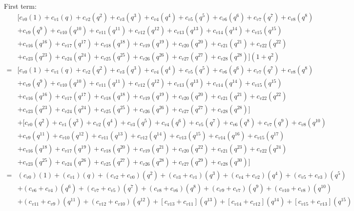 \documentclass[12pt]{article}
\begin{document}
First term:
\begin{align}
    &[  c_{v0}(1) + c_{v1}(q) + c_{v2}(q^2) + c_{v3}(q^3) + c_{v4}(q^4) + c_{v5}(q^5) + c_{v6}(q^6) + c_{v7}(q^7) + c_{v8}(q^8) \nonumber\\
    &+ c_{v9}(q^9) + c_{v10}(q^{10}) + c_{v11}(q^{11}) + c_{v12}(q^{12}) + c_{v13}(q^{13}) + c_{v14}(q^{14}) + c_{v15}(q^{15}) \nonumber\\
    &+ c_{v16}(q^{16})+ c_{v17}(q^{17}) + c_{v18}(q^{18}) + c_{v19}(q^{19}) + c_{v20}(q^{20}) + c_{v21}(q^{21}) + c_{v22}(q^{22}) \nonumber\\
    &+ c_{v23}(q^{23}) + c_{v24}(q^{24}) + c_{v25}(q^{25}) + c_{v26}(q^{26}) + c_{v27}(q^{27}) + c_{v28}(q^{28}) ] (1+q^2) \\
    =& [  c_{v0}(1) + c_{v1}(q) + c_{v2}(q^2) + c_{v3}(q^3) + c_{v4}(q^4) + c_{v5}(q^5) + c_{v6}(q^6) + c_{v7}(q^7) + c_{v8}(q^8) \nonumber\\
    &+ c_{v9}(q^9) + c_{v10}(q^{10}) + c_{v11}(q^{11}) + c_{v12}(q^{12}) + c_{v13}(q^{13}) + c_{v14}(q^{14}) + c_{v15}(q^{15}) \nonumber\\
    &+ c_{v16}(q^{16})+ c_{v17}(q^{17}) + c_{v18}(q^{18}) + c_{v19}(q^{19}) + c_{v20}(q^{20}) + c_{v21}(q^{21}) + c_{v22}(q^{22}) \nonumber\\
    &+ c_{v23}(q^{23}) + c_{v24}(q^{24}) + c_{v25}(q^{25}) + c_{v26}(q^{26}) + c_{v27}(q^{27}) + c_{v28}(q^{28}) ] \nonumber\\
    &+ [  c_{v0}(q^2) + c_{v1}(q^3) + c_{v2}(q^4) + c_{v3}(q^5) + c_{v4}(q^6) + c_{v5}(q^7) + c_{v6}(q^8) + c_{v7}(q^9) + c_{v8}(q^{10}) \nonumber\\
    &+ c_{v9}(q^{11}) + c_{v10}(q^{12}) + c_{v11}(q^{13}) + c_{v12}(q^{14}) + c_{v13}(q^{15}) + c_{v14}(q^{16}) + c_{v15}(q^{17}) \nonumber\\
    &+ c_{v16}(q^{18}) + c_{v17}(q^{19}) + c_{v18}(q^{20}) + c_{v19}(q^{21}) + c_{v20}(q^{22}) + c_{v21}(q^{23}) + c_{v22}(q^{24}) \nonumber\\
    &+ c_{v23}(q^{25}) + c_{v24}(q^{26}) + c_{v25}(q^{27}) + c_{v26}(q^{28}) + c_{v27}(q^{29}) + c_{v28}(q^{30}) ] \\
    =& (c_{v0})(1) + (c_{v1})(q) + (c_{v2} + c_{v0})(q^2) + (c_{v3} + c_{v1})(q^3) + (c_{v4} + c_{v2})(q^4) + (c_{v5} + c_{v3})(q^5) \nonumber\\
    &+ (c_{v6} + c_{v4})(q^6) + (c_{v7} + c_{v5})(q^7) + (c_{v8} + c_{v6})(q^8) + (c_{v9} + c_{v7})(q^9) + (c_{v10} + c_{v8})(q^{10}) \nonumber\\
    &+ (c_{v11} + c_{v9})(q^{11}) + (c_{v12} + c_{v10})(q^{12}) + [c_{v13} + c_{v11}](q^{13}) + [c_{v14} + c_{v12}](q^{14}) + [c_{v15} + c_{v13}](q^{15}) \nonumber\\

\end{align}
\end{document}
